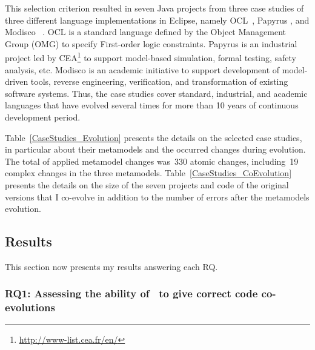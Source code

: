 
This selection criterion resulted in seven Java projects from three case studies of three different language implementations in Eclipse, namely OCL~\cite{MDTOCL}, Papyrus \cite{MDTPapyrus}, and Modisco~\cite{MDTModisco} .
%
OCL is a standard language defined by the Object Management Group (OMG) to specify First-order logic constraints. Papyrus is an industrial project led by CEA\footnote{\url{http://www-list.cea.fr/en/}} to support model-based simulation, formal testing, safety analysis, etc. Modisco is an academic initiative to support development of model-driven tools, reverse engineering, verification, and transformation of existing software systems. 
Thus, the case studies cover standard, industrial, and academic languages that have evolved several times for more than 10 years of continuous development period.

Table~\ref{CaseStudies_Evolution} presents the details on the selected case studies, in particular about their metamodels and the occurred changes during evolution. The total of applied metamodel changes was~330 atomic changes, including~19 complex changes in the three metamodels. 
%
Table~\ref{CaseStudies_CoEvolution} presents the details on the size of the seven projects and code of the original versions that I co-evolve in addition to the number of errors after the metamodels evolution. 

\subsection{Results}
\label{ch3__results}
This section now presents my results answering each RQ. 

\subsubsection{RQ1: Assessing the ability of \LLM~to give correct code co-evolutions }


